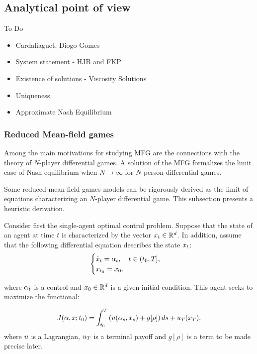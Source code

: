 \documentclass{article}
\begin{document}


\subsection{Analytical point of view}

To Do
\begin{itemize}
    \item Cardaliaguet, Diogo Gomes
    \item System statement - HJB and FKP
    \item Existence of solutions - Viscosity Solutions
    \item Uniqueness
    \item Approximate Nash Equilibrium
\end{itemize}

\subsubsection{Reduced Mean-field games}\label{reduced_mfg}
Among the main motivations for studying MFG are the connections with
 the theory of $N$-player differential games. A solution of the MFG formalizes 
 the limit case of Nash equilibrium when $N \to \infty$ for $N$-person differential games.

Some reduced mean-field games models can be rigorously derived as the limit 
of equations characterizing an $N$-player differential game. This subsection presents a heuristic derivation.

Consider first the single-agent optimal control problem.
Suppose that the state of an agent at time $t$ is characterized by the vector 
$x_t \in \mathbb{R}^d$.
In addition, assume that the following differential equation describes the state $x_t$:
\begin{equation}\label{reduced_mfg:state_evolution}
\begin{cases}
    \dot{ x}_t = {\alpha}_t,\quad t\in (t_0,T],\\
    {x}_{t_0} = x_0.
\end{cases}
\end{equation}

where $\alpha_t$ is a control and $x_0\in\mathbb{R}^d$ is a given initial condition. This agent seeks to maximize the functional:

\begin{equation}\label{reduced_mfg:payoff_functional}
    J({ \alpha},x; t_0) = \int_{t_0}^T \left(u({\alpha}_s,{x}_s) + g[\rho] \right) ds + u_T({ x}_T),
\end{equation}
where $u$ is a Lagrangian, $u_T$ is a terminal payoff and $g[\rho]$ is a term to be made precise later. 
\end{document}
